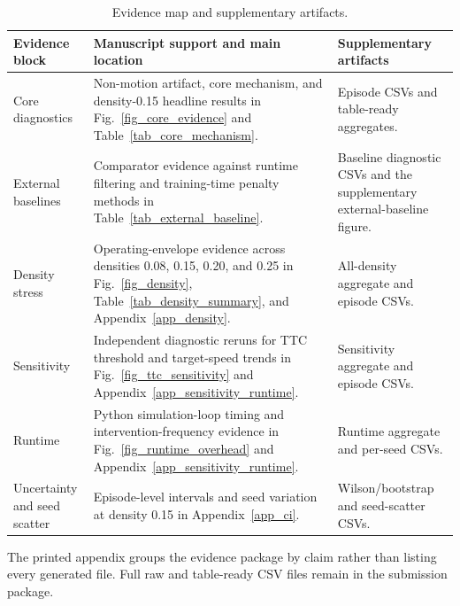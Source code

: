 \begin{table}[!htbp]
\centering
\caption{Evidence map and supplementary artifacts.}
\label{tab_data_manifest}
\footnotesize
\setlength{\tabcolsep}{4.0pt}
\renewcommand{\arraystretch}{1.12}
\begin{tabularx}{\textwidth}{@{}>{\raggedright\arraybackslash}p{}>{\raggedright\arraybackslash}X>{\raggedright\arraybackslash}p{}@{}}
\toprule
Evidence block & Manuscript support and main location & Supplementary artifacts \\
\midrule
Core diagnostics &
Non-motion artifact, core mechanism, and density-0.15 headline results in Fig.~\ref{fig_core_evidence} and Table~\ref{tab_core_mechanism}. &
Episode CSVs and table-ready aggregates. \\
\addlinespace[2pt]
External baselines &
Comparator evidence against runtime filtering and training-time penalty methods in Table~\ref{tab_external_baseline}. &
Baseline diagnostic CSVs and the supplementary external-baseline figure. \\
\addlinespace[2pt]
Density stress &
Operating-envelope evidence across densities 0.08, 0.15, 0.20, and 0.25 in Fig.~\ref{fig_density}, Table~\ref{tab_density_summary}, and Appendix~\ref{app_density}. &
All-density aggregate and episode CSVs. \\
\addlinespace[2pt]
Sensitivity &
Independent diagnostic reruns for TTC threshold and target-speed trends in Fig.~\ref{fig_ttc_sensitivity} and Appendix~\ref{app_sensitivity_runtime}. &
Sensitivity aggregate and episode CSVs. \\
\addlinespace[2pt]
Runtime &
Python simulation-loop timing and intervention-frequency evidence in Fig.~\ref{fig_runtime_overhead} and Appendix~\ref{app_sensitivity_runtime}. &
Runtime aggregate and per-seed CSVs. \\
\addlinespace[2pt]
Uncertainty and seed scatter &
Episode-level intervals and seed variation at density 0.15 in Appendix~\ref{app_ci}. &
Wilson/bootstrap and seed-scatter CSVs. \\
\bottomrule
\end{tabularx}
\begin{tablenotes}
\item The printed appendix groups the evidence package by claim rather than listing every generated file. Full raw and table-ready CSV files remain in the submission package.
\end{tablenotes}
\end{table}
